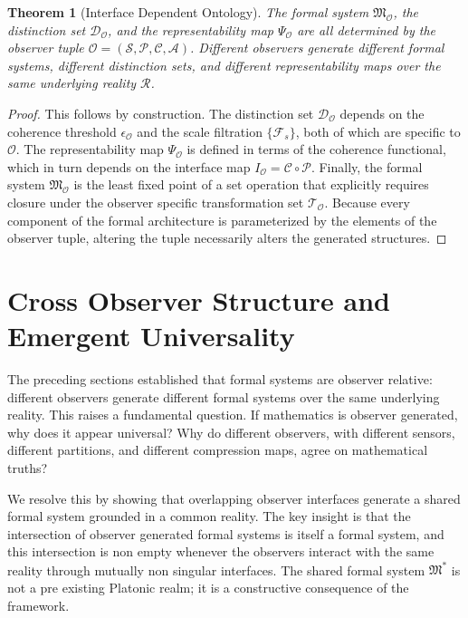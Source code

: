 \documentclass[12pt]{article}
\newtheorem{theorem}{Theorem}
\theoremstyle{definition}
\begin{document}
\begin{theorem}[Interface Dependent Ontology]
The formal system $\mathfrak{M}_{\mathcal{O}}$, the distinction set $\mathcal{D}_{\mathcal{O}}$, and the representability map $\Psi_{\mathcal{O}}$ are all determined by the observer tuple $\mathcal{O} = (\mathcal{S}, \mathcal{P}, \mathcal{C}, \mathcal{A})$. Different observers generate different formal systems, different distinction sets, and different representability maps over the same underlying reality $\mathcal{R}$.
\end{theorem}
\begin{proof}
This follows by construction. The distinction set $\mathcal{D}_{\mathcal{O}}$ depends on the coherence threshold $\epsilon_{\mathcal{O}}$ and the scale filtration $\{\mathcal{F}_s\}$, both of which are specific to $\mathcal{O}$. The representability map $\Psi_{\mathcal{O}}$ is defined in terms of the coherence functional, which in turn depends on the interface map $I_{\mathcal{O}} = \mathcal{C} \circ \mathcal{P}$. Finally, the formal system $\mathfrak{M}_{\mathcal{O}}$ is the least fixed point of a set operation that explicitly requires closure under the observer specific transformation set $\mathcal{T}_{\mathcal{O}}$. Because every component of the formal architecture is parameterized by the elements of the observer tuple, altering the tuple necessarily alters the generated structures.
\end{proof}

\section{Cross Observer Structure and Emergent Universality}

The preceding sections established that formal systems are observer relative: different observers generate different formal systems over the same underlying reality. This raises a fundamental question. If mathematics is observer generated, why does it appear universal? Why do different observers, with different sensors, different partitions, and different compression maps, agree on mathematical truths?

We resolve this by showing that overlapping observer interfaces generate a shared formal system grounded in a common reality. The key insight is that the intersection of observer generated formal systems is itself a formal system, and this intersection is non empty whenever the observers interact with the same reality through mutually non singular interfaces. The shared formal system $\mathfrak{M}^*$ is not a pre existing Platonic realm; it is a constructive consequence of the framework.
\end{document}

